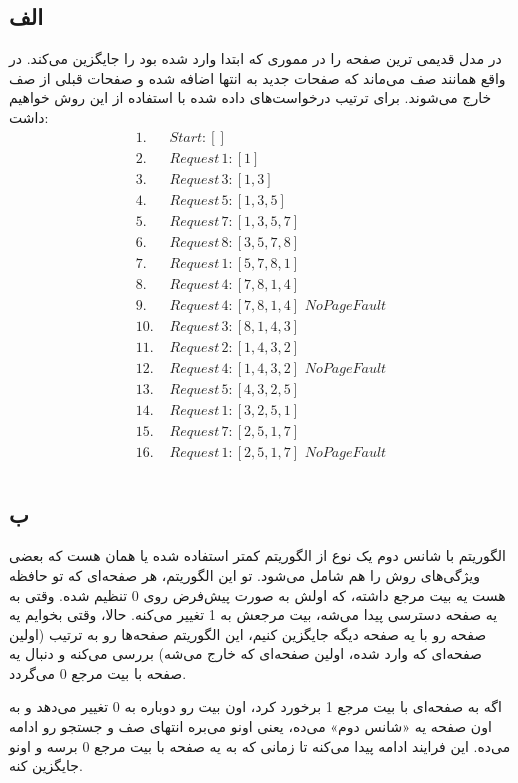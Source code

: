 \subsection*{الف}
در مدل
قدیمی ترین صفحه را در مموری که ابتدا وارد شده بود را جایگزین می‌کند. در واقع همانند صف می‌ماند که صفحات جدید به انتها اضافه شده و صفحات قبلی از صف خارج می‌شوند. برای ترتیب در‌خواست‌های داده شده با استفاده از این روش خواهیم داشت:
\begin{align*}
1.\,\, &Start: [] \\
2.\,\, &Request\, 1: [1] \\
3.\,\, &Request\, 3: [1, 3] \\
4.\,\, &Request\, 5: [1, 3, 5] \\
5.\,\, &Request\, 7: [1, 3, 5, 7] \\
6.\,\, &Request\, 8: [3, 5, 7, 8] \\
7.\,\, &Request\, 1: [5, 7, 8, 1] \\
8.\,\, &Request\, 4: [7, 8, 1, 4] \\
9.\,\, &Request\, 4: [7, 8, 1, 4] \,\, No Page Fault \\
10.\,\, &Request\, 3: [8, 1, 4, 3] \\
11.\,\, &Request\, 2: [1, 4, 3, 2] \\
12.\,\, &Request\, 4: [1, 4, 3, 2] \,\, No Page Fault \\
13.\,\, &Request\, 5: [4, 3, 2, 5] \\
14.\,\, &Request\, 1: [3, 2, 5, 1] \\
15.\,\, &Request\, 7: [2, 5, 1, 7] \\
16.\,\, &Request\, 1: [2, 5, 1, 7] \,\, No Page Fault \\
\end{align*}

\subsection*{ب}
الگوریتم  با شانس دوم یک نوع از الگوریتم کمتر استفاده شده یا همان  هست که بعضی ویژگی‌های روش  را هم شامل می‌شود. تو این الگوریتم، هر صفحه‌ای که تو حافظه هست یه بیت مرجع داشته، که اولش به صورت پیش‌فرض روی 0 تنظیم شده. وقتی به یه صفحه دسترسی پیدا می‌شه، بیت مرجعش به 1 تغییر می‌کنه. حالا، وقتی بخوایم یه صفحه رو با یه صفحه دیگه جایگزین کنیم، این الگوریتم صفحه‌ها رو به ترتیب  (اولین صفحه‌ای که وارد شده، اولین صفحه‌ای که خارج می‌شه) بررسی می‌کنه و دنبال یه صفحه با بیت مرجع 0 می‌گردد.

اگه به صفحه‌ای با بیت مرجع 1 برخورد کرد، اون بیت رو دوباره به 0 تغییر می‌دهد و به اون صفحه یه «شانس دوم» می‌ده، یعنی اونو می‌بره انتهای صف و جستجو رو ادامه می‌ده. این فرایند ادامه پیدا می‌کنه تا زمانی که به یه صفحه با بیت مرجع 0 برسه و اونو جایگزین کنه.

